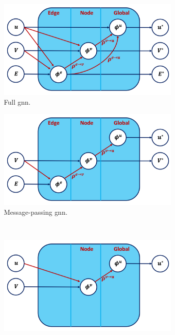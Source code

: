 \begin{figure}[h!]
    \centering
    \begin{subfigure}[b]{0.49\textwidth}
        \centering
        \includegraphics[scale=0.43]{Images/ML/fullGNN.png}
        \caption{Full \gls{gnn}.} 
        \label{fig:diverseGNNfull}
    \end{subfigure}
    \hfill
    \begin{subfigure}[b]{0.49\textwidth}
        \centering
        \includegraphics[scale=0.43]{Images/ML/messagepassingNN.png}
        \caption{Message-passing \gls{gnn}.} 
        \label{fig:pullsFTAGmp}
    \end{subfigure}
    \\  %
    \begin{subfigure}[b]{0.49\textwidth}
        \centering
        \includegraphics[scale=0.43]{Images/ML/deepSet.png}

\end{subfigure}
\end{figure}
